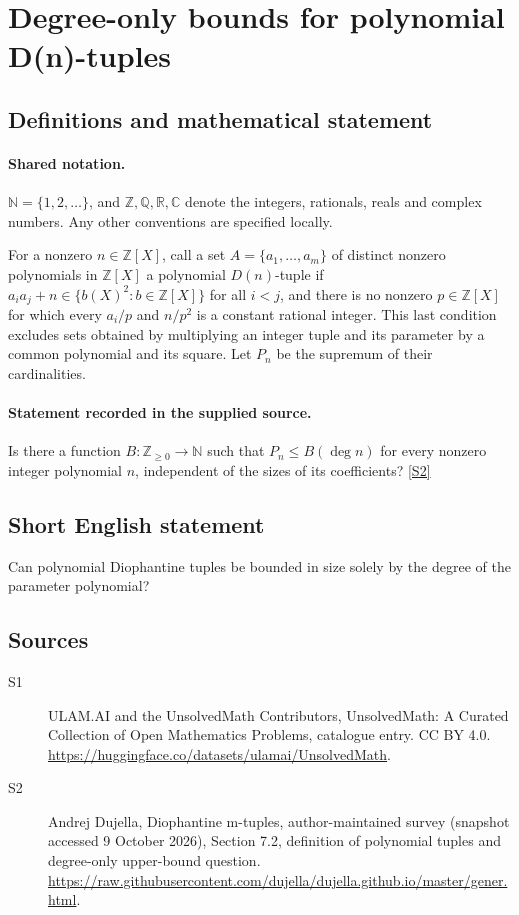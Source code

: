 \documentclass[11pt]{article}
\newcommand{\sref}[2]{\hyperlink{source:#1:#2}{[S#2]}}
\begin{document}
\section{Degree-only bounds for polynomial D(n)-tuples}\label{statement}

\subsection{Definitions and mathematical statement}

\paragraph{Shared notation.}$\mathbb N=\{1,2,\ldots\}$, and $\mathbb Z,\mathbb Q,\mathbb R,\mathbb C$ denote the integers, rationals, reals and complex numbers. Any other conventions are specified locally.


For a nonzero $n\in\mathbb Z[X]$, call a set $A=\{a_1,\ldots,a_m\}$ of distinct nonzero polynomials in $\mathbb Z[X]$ a polynomial $D(n)$-tuple if $a_i a_j+n\in\{b(X)^2:b\in\mathbb Z[X]\}$ for all $i<j$, and there is no nonzero $p\in\mathbb Z[X]$ for which every $a_i/p$ and $n/p^2$ is a constant rational integer. This last condition excludes sets obtained by multiplying an integer tuple and its parameter by a common polynomial and its square. Let $P_n$ be the supremum of their cardinalities.
\paragraph{Statement recorded in the supplied source.}
Is there a function $B:\mathbb Z_{\ge0}\to\mathbb N$ such that $P_n\le B(\deg n)$ for every nonzero integer polynomial $n$, independent of the sizes of its coefficients? \sref{statement}{2}
\subsection{Short English statement}
Can polynomial Diophantine tuples be bounded in size solely by the degree of the parameter polynomial?
\subsection{Sources}
\begin{description}
\item[\hypertarget{source:statement:1}{S1}] ULAM.AI and the UnsolvedMath Contributors, UnsolvedMath: A Curated Collection of Open Mathematics Problems, catalogue entry. CC BY 4.0. \url{https://huggingface.co/datasets/ulamai/UnsolvedMath}.
\item[\hypertarget{source:statement:2}{S2}] Andrej Dujella, Diophantine m-tuples, author-maintained survey (snapshot accessed 9 October 2026), Section 7.2, definition of polynomial tuples and degree-only upper-bound question. \url{https://raw.githubusercontent.com/dujella/dujella.github.io/master/gener.html}.
\end{description}
\label{end:statement}
\end{document}
